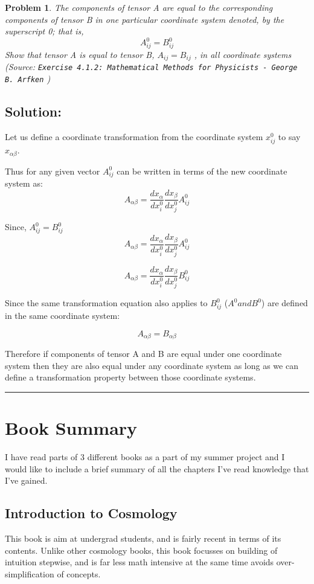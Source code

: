 \documentclass[11pt]{article}
\newenvironment{solution}{\subsection*{Solution:}}{\vspace{0.5cm} \hrule \vspace{0.7cm}}
\newtheorem{problem}{Problem}
\begin{document}
\begin{problem}

	The components of tensor A are equal to the corresponding components of
	tensor B in
	one particular coordinate system denoted, by the superscript 0; that is,
	$$ A_{ij}^0 = B_{ij}^0 $$
	Show that tensor A is equal to tensor B, $A_{ij} = B_{ij}$ , in all coordinate
	systems
	(Source: \texttt{Exercise 4.1.2: Mathematical Methods for Physicists -
	George B. Arfken} )
\end{problem}

\begin{solution}
	Let us define a coordinate transformation from the coordinate system
	$x^0_{ij}$ to say $x_{\alpha \beta}$.

	Thus for any given vector $A^0_{ij}$ can be written in terms of the new
	coordinate system as:
	$$ A_{\alpha \beta} = \frac{dx_{\alpha}}{dx^0_{i}}
	\frac{dx_{\beta}}{dx^0_{j}} A^0_{ij} $$

	Since, $A^0_{ij} = B^0_{ij}$
	$$ A_{\alpha \beta} = \frac{dx_{\alpha}}{dx^0_{i}}
	\frac{dx_{\beta}}{dx^0_{j}} A^0_{ij} $$

	$$ A_{\alpha \beta} = \frac{dx_{\alpha}}{dx^0_{i}}
	\frac{dx_{\beta}}{dx^0_{j}} B^0_{ij} $$

	Since the same transformation equation also applies to $B^0_{ij}$
	($A^0 and B^0$) are defined in the same coordinate system:

	$$ A_{\alpha \beta} = B_{\alpha \beta} $$

	Therefore if components of tensor A and B are equal under one coordinate
	system then they are also equal under any coordinate system as long as
	we can define a transformation property between those coordinate systems.
\end{solution}

\section{Book Summary}

I have read parts of 3 different books as a part of my summer project and I
would like to include a brief summary of all the chapters I've read knowledge
that I've gained.

\subsection{Introduction to Cosmology}

This book is aim at undergrad students, and is fairly recent in
terms of its contents. Unlike other cosmology books, this book focusses on
building of intuition stepwise, and is far less math intensive at
the same time avoids over-simplification of concepts.
\end{document}
